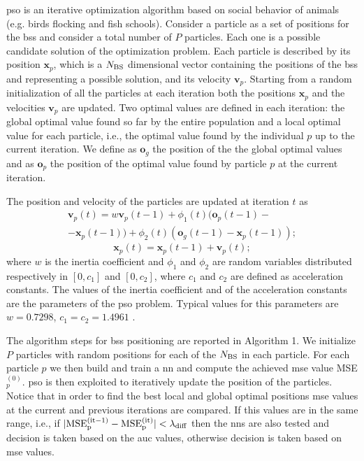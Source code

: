 \documentclass[twocolumns]{IEEEtran}
\begin{document}
\ac{pso} is an iterative optimization algorithm based on social behavior of animals (e.g. birds flocking and fish schools). Consider a particle as a set of positions for the \acp{bs} and consider a total number of $P$ particles. Each one is a possible candidate solution of the optimization problem. Each particle is described by its position $\bm{x}_p$, which is a $N_{\rm BS}$ dimensional vector containing the positions of the \acp{bs} and representing a possible solution, and its velocity $\bm{v}_p$.
Starting from a random initialization of all the particles at each iteration both the positions $\bm{x}_p$ and the velocities $\bm{v}_p$ are updated. Two optimal values are defined in each iteration: the global optimal value found so far by the entire population and a local optimal value for each particle, i.e., the optimal value found by the individual $p$ up to the current iteration. We define as $\bm{o}_g$ the position of the the global optimal values and as $\bm{o}_p$ the position of the optimal value found by particle $p$ at the current iteration.

The position and velocity of the particles are updated at iteration $t$ as
  \begin{equation}\label{eq: v up}
\begin{split}
  \bm{v}_p(t) = w\bm{v}_p(t-1)+\phi_1(t)(\bm{o}_p(t-1)-\\
  -\bm{x}_p(t-1))+\phi_2(t)(\bm{o}_g(t-1)-\bm{x}_p(t-1));
  \end{split}
  \end{equation}
  \begin{equation}\label{eq: p up}
  \bm{x}_p(t) = \bm{x}_p(t-1) + \bm{v}_p(t);
 \end{equation}
where $w$ is the inertia coefficient and $\phi_1$ and $\phi_2$ are random variables distributed respectively in $[0,c_1]$ and $[0,c_2]$, where $c_1$ and $c_2$ are defined as acceleration constants. The values of the inertia coefficient and of the acceleration constants are the parameters of the \ac{pso} problem. Typical values for this parameters are $w=0.7298$, $c_1=c_2=1.4961$ \cite{Kennedy-11}.

The algorithm steps for \acp{bs} positioning are reported in Algorithm 1. We initialize $P$ particles with random positions for each of the $N_{\rm BS}$ in each particle. For each particle $p$ we then build and train a \ac{nn} and compute the achieved \ac{mse} value MSE$_p^{(0)}$. \ac{pso} is then exploited to iteratively update the position of the particles. Notice that in order to find the best local and global optimal positions \ac{mse} values at the current and previous iterations are compared. If this values are in the same range, i.e., if $|\rm{MSE}_p^{(it-1)}-\rm{MSE}_p^{(it)}|<\lambda_{\rm diff}$ then the \acp{nn}  are also tested and decision is taken based on the \ac{auc} values, otherwise decision is taken based on \ac{mse} values.
\end{document}
